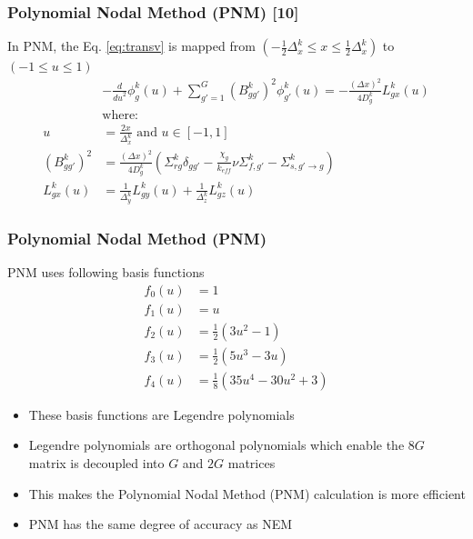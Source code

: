 \documentclass{beamer}
\begin{document}
\begin{frame}
\frametitle{Polynomial Nodal Method (PNM) [10]}
\begin{block}{In PNM, the Eq. \eqref{eq:transv} is mapped from $\left( { - \frac{1}{2}\Delta _x^k \le x \le \frac{1}{2}\Delta _x^k} \right)$ to $\left( { -1 \le u \le 1} \right)$}
  \begin{equation*}
    \begin{split}
      & -\frac{d}{{du}^2}\phi _{g}^k(u) + \sum\limits_{g' = 1}^G {\left(B_{gg'}^k \right)^2 \phi _{g'}^k(u)} =  -\frac{\left(\Delta x \right)^2}{4D_g^k}L_{gx}^k (u) \\
      & \text{where:} \\
      u &= \frac{2x}{{\Delta _x^k}} \text{ and } u\in[-1,1] \\
      \left(B_{gg'}^k \right)^2 &= \frac{\left(\Delta x \right)^2}{4D_g^k} \left( \Sigma_{rg}^k \delta_{gg'} - \frac{\chi_g}{k_{eff}}\nu\Sigma_{f,g'}^k - \Sigma_{s,g'\rightarrow g}^k\right) \\
      L_{gx}^k (u) &= \frac{1}{{\Delta _y^k}}L_{gy}^k(u) + \frac{1}{{\Delta _z^k}}L_{gz}^k(u)
    \end{split}
  \end{equation*}
\end{block}
\end{frame}


\begin{frame}
\frametitle{Polynomial Nodal Method (PNM)}
\begin{block}{PNM uses following basis functions}
    \begin{equation*}
      \begin{split}
        \scriptscriptstyle {f_0}(u) &{\scriptscriptstyle =} \scriptscriptstyle 1 \\
        \scriptscriptstyle {f_1}(u) &{\scriptscriptstyle =} \scriptscriptstyle u  \\
        \scriptscriptstyle {f_2}(u) &{\scriptscriptstyle =} \scriptscriptstyle  \frac{1}{2} \left(3u^2-1 \right) \\
        \scriptscriptstyle {f_3}(u) &{\scriptscriptstyle =} \scriptscriptstyle \frac{1}{2} \left(5u^3-3u \right) \\
        \scriptscriptstyle {f_4}(u) &{\scriptscriptstyle =} \scriptscriptstyle \frac{1}{8} \left(35u^4-30u^2+3 \right)
      \end{split}
    \end{equation*}
\end{block}
\begin{itemize}
\item These basis functions are Legendre polynomials
\item Legendre polynomials are orthogonal polynomials which enable the $8G$ matrix is decoupled into $G$ and $2G$ matrices
\item This makes the Polynomial Nodal Method (PNM) calculation is more efficient
\item PNM has the same degree of accuracy as NEM
\end{itemize}
\end{frame}
\end{document}
